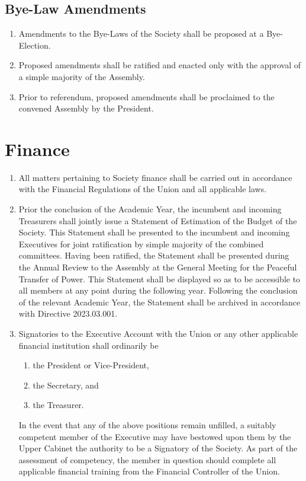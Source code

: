 \documentclass{scrartcl}
\begin{document}
        \subsection{Bye-Law Amendments}
            \label{bye-election--bye-law-amendment}
            \begin{enumerate}
                \item Amendments to the Bye-Laws of the Society shall be proposed at a Bye-Election.
                \item Proposed amendments shall be ratified and enacted only with the approval of a simple majority of the Assembly.
                \item Prior to referendum, proposed amendments shall be proclaimed to the convened Assembly by the President.
            \end{enumerate}

    \clearpage
    \section{Finance}
        \label{finance}
        \begin{enumerate}
            \item All matters pertaining to Society finance shall be carried out in accordance with the Financial Regulations of the Union and all applicable laws.
            \item Prior the conclusion of the Academic Year, the incumbent and incoming Treasurers shall jointly issue a Statement of Estimation of the Budget of the Society.
                \subitem This Statement shall be presented to the incumbent and incoming Executives for joint ratification by simple majority of the combined committees.
                \subitem Having been ratified, the Statement shall be presented during the Annual Review to the Assembly at the General Meeting for the Peaceful Transfer of Power.
                \subitem This Statement shall be displayed so as to be accessible to all members at any point during the following year.
                \subitem Following the conclusion of the relevant Academic Year, the Statement shall be archived in accordance with Directive 2023.03.001.
            \item Signatories to the Executive Account with the Union or any other applicable financial institution shall ordinarily be
                \begin{enumerate}
                    \item the President or Vice-President,
                    \item the Secretary, and
                    \item the Treasurer.
                \end{enumerate}
                \subitem In the event that any of the above positions remain unfilled, a suitably competent member of the Executive may have bestowed upon them by the Upper Cabinet the authority to be a Signatory of the Society.
                \subitem As part of the assessment of competency, the member in question should complete all applicable financial training from the Financial Controller of the Union.
        \end{enumerate}
\end{document}
